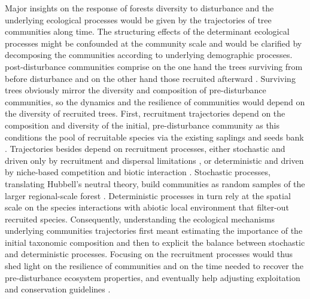 \documentclass[fleqn,10pt]{ArtEcoFoG} %
\begin{document}
Major insights on the response of forests diversity to disturbance and
the underlying ecological processes would be given by the trajectories
of tree communities along time. The structuring effects of the determinant ecological 
processes might be confounded at the community scale
\citep{Chave2004} and would be clarified by decomposing the communities
according to underlying demographic processes. post-disturbance communities comprise on
the one hand the trees surviving from before disturbance and on the
other hand those recruited afterward \citep{Herault2018}. Surviving
trees obviously mirror the diversity and composition of
pre-disturbance communities, so the dynamics and the resilience of
communities would depend on the diversity of recruited trees. First,
recruitment trajectories depend on the composition and diversity of the
initial, pre-disturbance community as this conditions the pool of
recruitable species via the existing saplings and seeds bank
\citep{Herault2018}. Trajectories besides depend on recruitment
processes, either stochastic and driven only by recruitment and dispersal
limitations \citep{Hurtt1995, Hubbell2001}, or deterministic and driven
by niche-based competition and biotic interaction \citep{Adler2007}.
Stochastic processes, translating Hubbell's neutral theory, build
communities as random samples of the larger regional-scale forest
\citep{Hubbell2001, Chave2004}. Deterministic processes in turn rely at
the spatial scale on the species interactions with abiotic
local environment that filter-out recruited species.
Consequently, understanding the ecological mechanisms underlying communities trajectories first meant estimating the importance of the initial taxonomic composition and then
to explicit the balance between stochastic and deterministic processes.
Focusing on the recruitment processes would thus shed light on the resilience of
communities and on the time needed to recover the pre-disturbance
ecosystem properties, and eventually help adjusting exploitation and
conservation guidelines \citep{Diaz2005, Gardner2007, Schwartz2017}.
\end{document}
